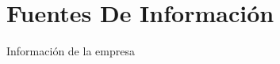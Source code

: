 \renewcommand{\thesection}{\Roman{section}}
\section{Fuentes De Información}

{\large Información de la empresa}\\